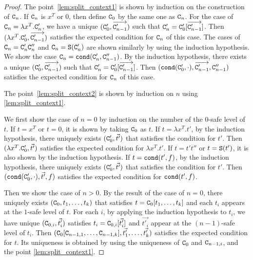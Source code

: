 \begin{proof}
  The point~\ref{lem:split_context1} is shown by induction on the construction of ${\tt C}_{n}$.
  If ${\tt C}_{n}$ is $x^T$ or $0$, then define ${\tt C}_{0}$ by the same one as ${\tt C}_{n}$. 
  For the case of ${\tt C}_{n} = \lambda x^T.{\tt C}_{n}'$, 
  we have a unique $({\tt C}_{0}',\overrightarrow{{\tt C}_{n-1}'})$ such that 
  ${\tt C}_{n}' = {\tt C}_{0}'[\overrightarrow{{\tt C}_{n-1}'}]$.
  Then $(\lambda x^T.{\tt C}_{0}',\overrightarrow{{\tt C}_{n-1}'})$
  satisfies the expected condition for ${\tt C}_{n}$ of this case. 
  The cases of ${\tt C}_{n} = {\tt C}_{n}'{\tt C}_{n}''$ and ${\tt C}_{n} = {\tt S}({\tt C}_{n}')$
  are shown similarly by using the induction hypothesis.
  We show the case ${\tt C}_{n} = {\tt cond}({\tt C}_{n}',{\tt C}_{n-1}'')$. 
  By the induction hypothesis, there exists a unique
  $({\tt C}_{0}',\overrightarrow{{\tt C}_{n-1}'})$ such that 
  ${\tt C}_{n}' = {\tt C}_{0}'[\overrightarrow{{\tt C}_{n-1}'}]$.
  Then $({\tt cond}({\tt C}_{0}',\cdot), \overrightarrow{{\tt C}_{n-1}'}, {\tt C}_{n-1}'')$
  satisfies the expected condition for ${\tt C}_{n}$ of this case. 
  
  The point~\ref{lem:split_context2} is shown
  by induction on $n$ using \ref{lem:split_context1}.

  We first show the case of $n=0$ by induction on the number of the $0$-safe level of $t$.
  If $t = x^T$ or $t = 0$, it is shown by taking ${\tt C}_{0}$ as $t$.
  If $t = \lambda x^T.t'$, by the induction hypothesis,
  there uniquely exists $({\tt C}_{0}',\vec{t'})$ that satisfies the condition for $t'$. 
  Then $(\lambda x^T.{\tt C}_{0}',\vec{t'})$ satisfies
  the expected condition for $\lambda x^T.t'$. 
  If $t =t't''$ or $t = {\tt S}(t')$, it is also shown by the induction hypothesis. 
  If $t = {\tt cond}(t',f)$, by the induction hypothesis, 
  there uniquely exists $({\tt C}_{0}',\vec{t'})$ that satisfies the condition for $t'$. 
  Then $({\tt cond}({\tt C}_{0}',\cdot),\vec{t'},f)$ satisfies
  the expected condition for ${\tt cond}(t',f)$. 

  Then we show the case of $n>0$.
  By the result of the case of $n=0$, there uniquely exists $({\tt C}_{0},t_1,\ldots,t_k)$
  that satisfies $t = {\tt C}_{0}[t_1,\ldots,t_k]$ and
  each $t_i$ appears at the $1$-safe level of $t$.
  For each $i$, by applying the induction hypothesis to $t_i$,
  we have unique $({\tt C}_{0,i},\vec{t'_i})$
  satisfies $t_i = {\tt C}_{0,i}[\vec{t'_i}]$ and $\vec{t'_i}$ appear
  at the $(n-1)$-safe level of $t_i$. 
  Then $({\tt C}_{0}[{\tt C}_{n-1,1},\ldots,{\tt C}_{n-1,k}],\vec{t'_1},\ldots,\vec{t'_k})$
  satisfies the expected condition for $t$.
  Its uniqueness is obtained by using the uniqueness of ${\tt C}_{0}$ and ${\tt C}_{n-1,i}$,
  and the point \ref{lem:split_context1}. 
\end{proof}

